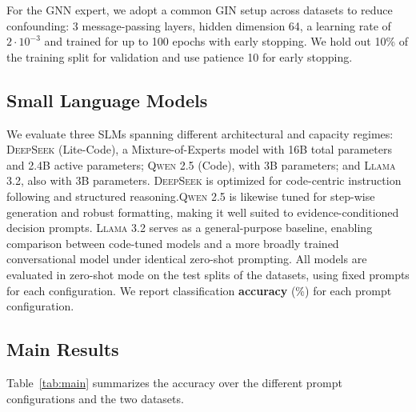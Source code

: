 \documentclass[
]{ceurart}
\newcommand{\model}[1]{\textsc{#1}}
\newcommand{\gin}{\textsc{GIN}}
\begin{document}
\noindent For the GNN expert, we adopt a common \gin{} setup across datasets to reduce confounding: 3 message-passing layers, hidden dimension 64, a learning rate of $2\cdot 10^{-3}$ and trained for up to 100 epochs with early stopping. We hold out 10\% of the training split for validation and use patience 10 for early stopping.

\subsection{Small Language Models}
\noindent We evaluate three SLMs spanning different architectural and capacity regimes: \model{DeepSeek} (Lite-Code), a Mixture-of-Experts model with 16B total parameters and 2.4B active parameters; \model{Qwen 2.5} (Code), with 3B parameters; and \model{Llama 3.2}, also with 3B parameters. \model{DeepSeek} is optimized for code-centric instruction following and structured reasoning.\model{Qwen 2.5} is likewise tuned for step-wise generation and robust formatting, making it well suited to evidence-conditioned decision prompts. \model{Llama 3.2} serves as a general-purpose baseline, enabling comparison between code-tuned models and a more broadly trained conversational model under identical zero-shot prompting. All models are evaluated in zero-shot mode on the test splits of the datasets, using fixed prompts for each configuration. We report classification \textbf{accuracy} (\%) for each prompt configuration.


\subsection{Main Results}
Table~\ref{tab:main} summarizes the accuracy over the different prompt configurations and the two datasets.
\end{document}
